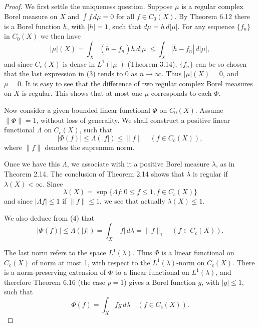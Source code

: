 \begin{proof}
We first settle the uniqueness question. Suppose $\mu$ is a regular complex Borel measure on $X$ and $\int f \, d\mu = 0$ for all $f \in C_0(X)$. By Theorem 6.12 there is a Borel function $h$, with $|h| = 1$, such that $d\mu = h \, d|\mu|$. For any sequence $\{f_n\}$ in $C_0(X)$ we then have
\begin{equation}
|\mu|(X) = \int_X (\bar{h} - f_n)h \, d|\mu| \leq \int_X |\bar{h} - f_n| \, d|\mu|, \tag{3}
\end{equation}
and since $C_c(X)$ is dense in $L^1(|\mu|)$ (Theorem 3.14), $\{f_n\}$ can be so chosen that the last expression in (3) tends to 0 as $n \to \infty$. Thus $|\mu|(X) = 0$, and $\mu = 0$. It is easy to see that the difference of two regular complex Borel measures on $X$ is regular. This shows that at most one $\mu$ corresponds to each $\Phi$.

Now consider a given bounded linear functional $\Phi$ on $C_0(X)$. Assume $\|\Phi\| = 1$, without loss of generality. We shall construct a positive linear functional $\Lambda$ on $C_c(X)$, such that
\begin{equation}
|\Phi(f)| \leq \Lambda(|f|) \leq \|f\| \quad (f \in C_c(X)), \tag{4}
\end{equation}
where $\|f\|$ denotes the supremum norm.

Once we have this $\Lambda$, we associate with it a positive Borel measure $\lambda$, as in Theorem 2.14. The conclusion of Theorem 2.14 shows that $\lambda$ is regular if $\lambda(X) < \infty$. Since
\begin{equation}
\lambda(X) = \sup \{\Lambda f : 0 \leq f \leq 1, f \in C_c(X)\}
\end{equation}
and since $|\Lambda f| \leq 1$ if $\|f\| \leq 1$, we see that actually $\lambda(X) \leq 1$.

We also deduce from (4) that
\begin{equation}
|\Phi(f)| \leq \Lambda(|f|) = \int_X |f| \, d\lambda = \|f\|_1 \quad (f \in C_c(X)). \tag{5}
\end{equation}

The last norm refers to the space $L^1(\lambda)$. Thus $\Phi$ is a linear functional on $C_c(X)$ of norm at most 1, with respect to the $L^1(\lambda)$-norm on $C_c(X)$. There is a norm-preserving extension of $\Phi$ to a linear functional on $L^1(\lambda)$, and therefore Theorem 6.16 (the case $p = 1$) gives a Borel function $g$, with $|g| \leq 1$, such that
\begin{equation}
\Phi(f) = \int_X fg \, d\lambda \quad (f \in C_c(X)). \tag{6}
\end{equation}


\end{proof}

